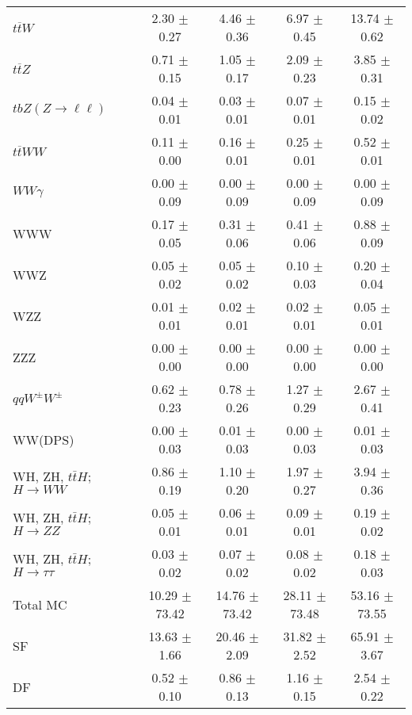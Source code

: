 \begin{tabular}{l|cccc}
                   $t\overline{t}W$ &  2.30 $\pm$  0.27 &  4.46 $\pm$  0.36 &  6.97 $\pm$  0.45 & 13.74 $\pm$  0.62 \\
                   $t\overline{t}Z$ &  0.71 $\pm$  0.15 &  1.05 $\pm$  0.17 &  2.09 $\pm$  0.23 &  3.85 $\pm$  0.31 \\
    $tbZ (Z \rightarrow \ell \ell)$ &  0.04 $\pm$  0.01 &  0.03 $\pm$  0.01 &  0.07 $\pm$  0.01 &  0.15 $\pm$  0.02 \\
                  $t\overline{t}WW$ &  0.11 $\pm$  0.00 &  0.16 $\pm$  0.01 &  0.25 $\pm$  0.01 &  0.52 $\pm$  0.01 \\
                         $WW\gamma$ &  0.00 $\pm$  0.09 &  0.00 $\pm$  0.09 &  0.00 $\pm$  0.09 &  0.00 $\pm$  0.09 \\
                                WWW &  0.17 $\pm$  0.05 &  0.31 $\pm$  0.06 &  0.41 $\pm$  0.06 &  0.88 $\pm$  0.09 \\
                                WWZ &  0.05 $\pm$  0.02 &  0.05 $\pm$  0.02 &  0.10 $\pm$  0.03 &  0.20 $\pm$  0.04 \\
                                WZZ &  0.01 $\pm$  0.01 &  0.02 $\pm$  0.01 &  0.02 $\pm$  0.01 &  0.05 $\pm$  0.01 \\
                                ZZZ &  0.00 $\pm$  0.00 &  0.00 $\pm$  0.00 &  0.00 $\pm$  0.00 &  0.00 $\pm$  0.00 \\
                 $qqW^{\pm}W^{\pm}$ &  0.62 $\pm$  0.23 &  0.78 $\pm$  0.26 &  1.27 $\pm$  0.29 &  2.67 $\pm$  0.41 \\
                            WW(DPS) &  0.00 $\pm$  0.03 &  0.01 $\pm$  0.03 &  0.00 $\pm$  0.03 &  0.01 $\pm$  0.03 \\
WH, ZH, $t\bar{t}H$; $H \rightarrow WW$ &  0.86 $\pm$  0.19 &  1.10 $\pm$  0.20 &  1.97 $\pm$  0.27 &  3.94 $\pm$  0.36 \\
WH, ZH, $t\bar{t}H$; $H \rightarrow ZZ$ &  0.05 $\pm$  0.01 &  0.06 $\pm$  0.01 &  0.09 $\pm$  0.01 &  0.19 $\pm$  0.02 \\
WH, ZH, $t\bar{t}H$; $H \rightarrow \tau\tau$ &  0.03 $\pm$  0.02 &  0.07 $\pm$  0.02 &  0.08 $\pm$  0.02 &  0.18 $\pm$  0.03 \\
\hline\hline
                           Total MC & 10.29 $\pm$ 73.42 & 14.76 $\pm$ 73.42 & 28.11 $\pm$ 73.48 & 53.16 $\pm$ 73.55 \\
\hline
                                 SF & 13.63 $\pm$  1.66 & 20.46 $\pm$  2.09 & 31.82 $\pm$  2.52 & 65.91 $\pm$  3.67 \\
                                 DF &  0.52 $\pm$  0.10 &  0.86 $\pm$  0.13 &  1.16 $\pm$  0.15 &  2.54 $\pm$  0.22 \\

\end{tabular}
